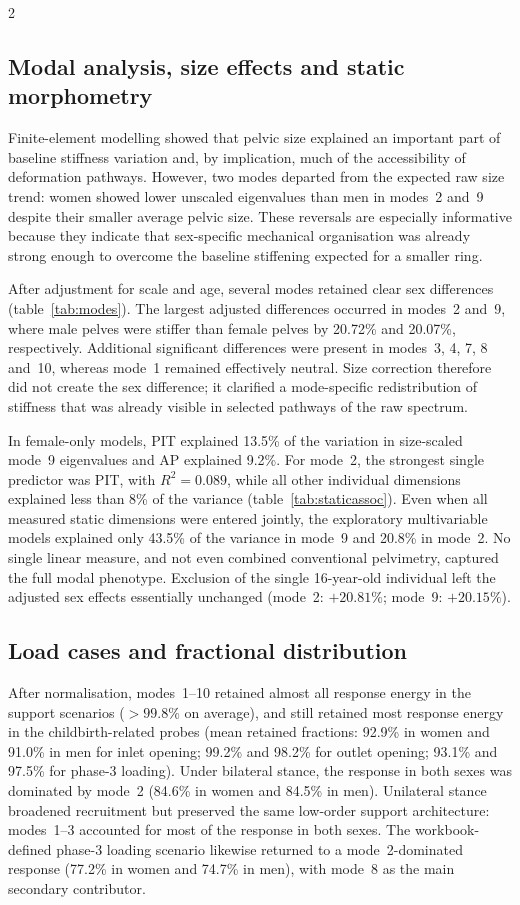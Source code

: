 \documentclass[openacc]{rsproca_new}
\begin{document}
\begin{multicols}{2}
\subsection{Modal analysis, size effects and static morphometry}

Finite-element modelling showed that pelvic size explained an important part of baseline stiffness variation and, by implication, much of the accessibility of deformation pathways. However, two modes departed from the expected raw size trend: women showed lower unscaled eigenvalues than men in modes~2 and~9 despite their smaller average pelvic size. These reversals are especially informative because they indicate that sex-specific mechanical organisation was already strong enough to overcome the baseline stiffening expected for a smaller ring.

After adjustment for scale and age, several modes retained clear sex differences (table~\ref{tab:modes}). The largest adjusted differences occurred in modes~2 and~9, where male pelves were stiffer than female pelves by 20.72\% and 20.07\%, respectively. Additional significant differences were present in modes~3, 4, 7, 8 and~10, whereas mode~1 remained effectively neutral. Size correction therefore did not create the sex difference; it clarified a mode-specific redistribution of stiffness that was already visible in selected pathways of the raw spectrum.

In female-only models, PIT explained 13.5\% of the variation in size-scaled mode~9 eigenvalues and AP explained 9.2\%. For mode~2, the strongest single predictor was PIT, with $R^2=0.089$, while all other individual dimensions explained less than 8\% of the variance (table~\ref{tab:staticassoc}). Even when all measured static dimensions were entered jointly, the exploratory multivariable models explained only 43.5\% of the variance in mode~9 and 20.8\% in mode~2. No single linear measure, and not even combined conventional pelvimetry, captured the full modal phenotype. Exclusion of the single 16-year-old individual left the adjusted sex effects essentially unchanged (mode~2: $+20.81\%$; mode~9: $+20.15\%$).

\subsection{Load cases and fractional distribution}

After normalisation, modes~1--10 retained almost all response energy in the support scenarios ($>99.8\%$ on average), and still retained most response energy in the childbirth-related probes (mean retained fractions: 92.9\% in women and 91.0\% in men for inlet opening; 99.2\% and 98.2\% for outlet opening; 93.1\% and 97.5\% for phase-3 loading). Under bilateral stance, the response in both sexes was dominated by mode~2 (84.6\% in women and 84.5\% in men). Unilateral stance broadened recruitment but preserved the same low-order support architecture: modes~1--3 accounted for most of the response in both sexes. The workbook-defined phase-3 loading scenario likewise returned to a mode~2-dominated response (77.2\% in women and 74.7\% in men), with mode~8 as the main secondary contributor.


\end{multicols}
\end{document}
